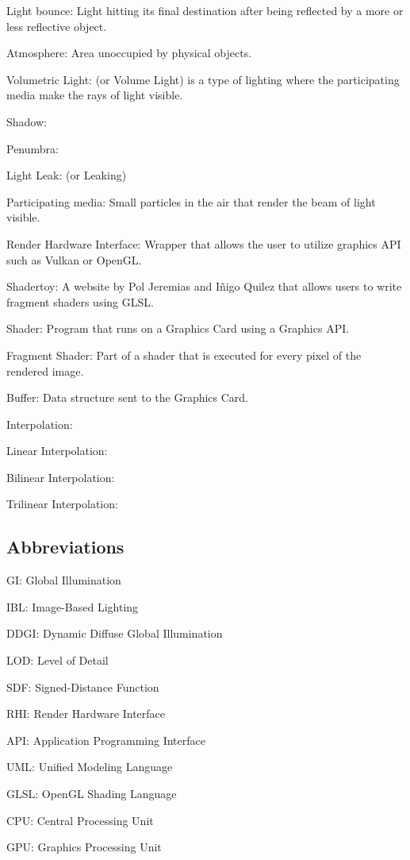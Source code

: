 \documentclass{rapportCS}
\begin{document}
Light bounce: Light hitting its final destination after being reflected by a more or less reflective object.

Atmosphere: Area unoccupied by physical objects.

Volumetric Light: (or Volume Light) is a type of lighting where the participating media make the rays of light visible.

Shadow:

Penumbra:

Light Leak: (or Leaking)

Participating media: Small particles in the air that render the beam of light visible.

Render Hardware Interface: Wrapper that allows the user to utilize graphics API such as Vulkan or OpenGL.

Shadertoy: A website by Pol Jeremias and Iñigo Quilez that allows users to write fragment shaders using GLSL.

Shader: Program that runs on a Graphics Card using a Graphics API.

Fragment Shader: Part of a shader that is executed for every pixel of the rendered image.

Buffer: Data structure sent to the Graphics Card.

Interpolation:

Linear Interpolation:

Bilinear Interpolation:

Trilinear Interpolation:


\subsection*{Abbreviations}

GI: Global Illumination

IBL: Image-Based Lighting

DDGI: Dynamic Diffuse Global Illumination

LOD: Level of Detail

SDF: Signed-Distance Function

RHI: Render Hardware Interface

API: Application Programming Interface

UML: Unified Modeling Language

GLSL: OpenGL Shading Language

CPU: Central Processing Unit

GPU: Graphics Processing Unit
\end{document}

